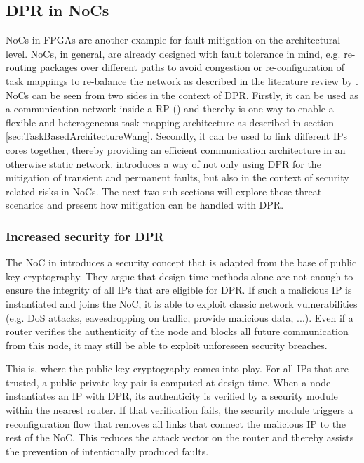 \subsection{\gls{DPR} in \glspl{NoC}}\label{sec:NoC}
\glspl{NoC} in \glspl{FPGA} are another example for fault mitigation on the architectural level. 
\glspl{NoC}, in general, are already designed with fault tolerance in mind, e.g. re-routing packages over different paths to avoid congestion or re-configuration of task mappings to re-balance the network as described in the literature review by \cite{kadri_survey_2019}.
\glspl{NoC} can be seen from two sides in the context of \gls{DPR}. 
Firstly, it can be used as a communication network inside a \gls{RP} (\cite{majer_packet_2005}) and thereby is one way to enable a flexible and heterogeneous task mapping architecture as described in section \ref{sec:TaskBasedArchitectureWang}. 
Secondly, it can be used to link different \glspl{IP} cores together, thereby providing an efficient communication architecture in an otherwise static network.
\cite{wehbe_secure_2016}  introduces a way of not only using \gls{DPR} for the mitigation of transient and permanent faults, but also in the context of security related risks in \glspl{NoC}.
The next two sub-sections will explore these threat scenarios and present how mitigation can be handled with \gls{DPR}. 

\subsubsection{Increased security for \gls{DPR}}\label{sec:IncreasedSecurityNoC}
The \gls{NoC} in \cite{wehbe_secure_2016} introduces a security concept that is adapted from the base of public key cryptography. 
They argue that design-time methods alone are not enough to ensure the integrity of all \glspl{IP} that are eligible for \gls{DPR}.
If such a malicious \gls{IP} is instantiated and joins the \gls{NoC}, it is able to exploit classic network vulnerabilities (e.g. \gls{DoS} attacks, eavesdropping on traffic, provide malicious data, ...).
Even if a router verifies the authenticity of the node and blocks all future communication from this node, it may still be able to exploit unforeseen security breaches.  

This is, where the public key cryptography comes into play. 
For all \glspl{IP} that are trusted, a public-private key-pair is computed at design time. 
When a node instantiates an \gls{IP} with \gls{DPR}, its authenticity is verified by a security module within the nearest router. 
If that verification fails, the security module triggers a reconfiguration flow that removes all links that connect the malicious \gls{IP} to the rest of the \gls{NoC}.
This reduces the attack vector on the router and thereby assists the prevention of intentionally produced faults. 

